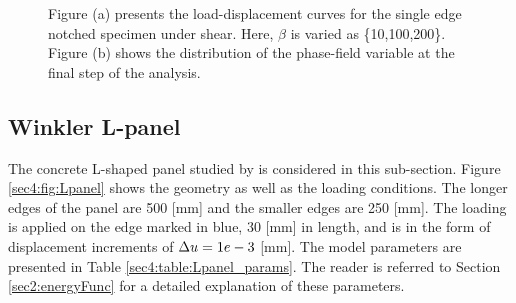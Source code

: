 \documentclass[11pt]{article}
\begin{document}
\begin{figure}[!ht]
\begin{subfigure}[t]{0.45\textwidth}
    \caption{ }
    \label{sec4:fig:pf_sen_shear_failure}
  \end{subfigure}
  \caption{Figure (a) presents the load-displacement curves for the single edge notched specimen under shear. Here, $\beta$ is varied as \{10,100,200\}. Figure (b) shows the distribution of the phase-field variable at the final step of the analysis.}
\end{figure}

\subsection{Winkler L-panel}\label{sec4:Lpanel}

The concrete L-shaped panel studied by \cite{winkler2001traglastuntersuchungen,unger2007modelling} is considered in this sub-section. Figure \ref{sec4:fig:Lpanel} shows the geometry as well as the loading conditions. The longer edges of the panel are 500 [mm] and the smaller edges are 250 [mm]. The loading is applied on the edge marked in blue, 30 [mm] in length, and is in the form of displacement increments of $\Delta\hbox{$u$} = 1e-3$ [mm]. The model parameters are presented in Table \ref{sec4:table:Lpanel_params}. The reader is referred to Section \ref{sec2:energyFunc} for a detailed explanation of these parameters.
\end{document}
